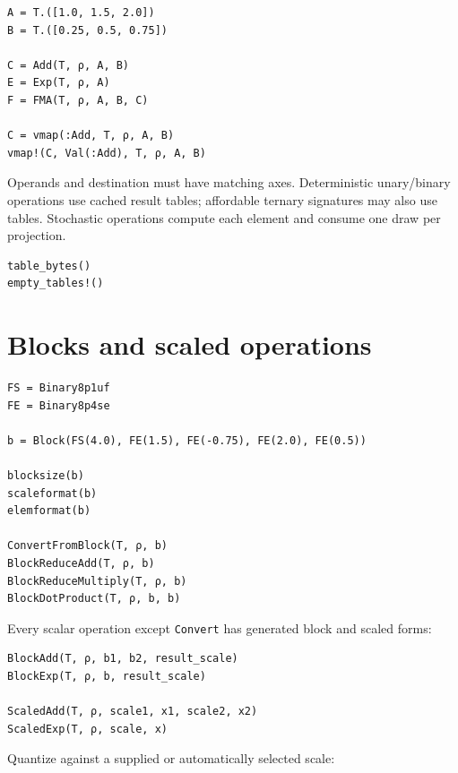 \begin{verbatim}
A = T.([1.0, 1.5, 2.0])
B = T.([0.25, 0.5, 0.75])

C = Add(T, ρ, A, B)
E = Exp(T, ρ, A)
F = FMA(T, ρ, A, B, C)

C = vmap(:Add, T, ρ, A, B)
vmap!(C, Val(:Add), T, ρ, A, B)
\end{verbatim}



Operands and destination must have matching axes. Deterministic unary/binary operations use cached result tables; affordable ternary signatures may also use tables. Stochastic operations compute each element and consume one draw per projection.




\begin{verbatim}
table_bytes()
empty_tables!()
\end{verbatim}



\section{Blocks and scaled operations}



\label{17754733778172498420}{}



\begin{verbatim}
FS = Binary8p1uf
FE = Binary8p4se

b = Block(FS(4.0), FE(1.5), FE(-0.75), FE(2.0), FE(0.5))

blocksize(b)
scaleformat(b)
elemformat(b)

ConvertFromBlock(T, ρ, b)
BlockReduceAdd(T, ρ, b)
BlockReduceMultiply(T, ρ, b)
BlockDotProduct(T, ρ, b, b)
\end{verbatim}



Every scalar operation except \texttt{Convert} has generated block and scaled forms:




\begin{verbatim}
BlockAdd(T, ρ, b1, b2, result_scale)
BlockExp(T, ρ, b, result_scale)

ScaledAdd(T, ρ, scale1, x1, scale2, x2)
ScaledExp(T, ρ, scale, x)
\end{verbatim}



Quantize against a supplied or automatically selected scale:




